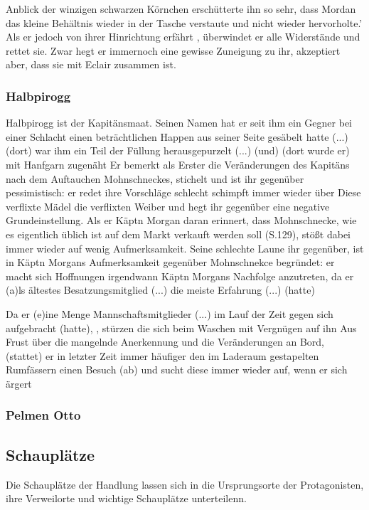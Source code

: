 {Anblick der winzigen schwarzen Körnchen erschütterte ihn so sehr, dass Mordan das kleine Behältnis wieder in der Tasche verstaute und nicht wieder hervorholte.'\cite[S.531]{pir} Als er jedoch von ihrer Hinrichtung erfährt , überwindet er alle Widerstände und rettet sie. \cite[S.620]{pir} Zwar hegt er immernoch eine gewisse Zuneigung zu ihr, akzeptiert aber, dass sie mit Eclair zusammen ist. \cite[S.632f]{pir}

\subsubsection{Halbpirogg}
Halbpirogg ist der Kapitänsmaat. Seinen Namen hat er seit ihm ein Gegner bei einer Schlacht 
einen beträchtlichen Happen aus seiner Seite gesäbelt hatte (...)(dort) 
war ihm ein Teil der Füllung herausgepurzelt (...) 
(und) (dort wurde er) mit Hanfgarn zugenäht\cite[S. 33]{pir}
Er bemerkt als Erster die Veränderungen des Kapitäns nach 
dem Auftauchen Mohnschneckes, stichelt und ist ihr gegenüber pessimistisch:
er redet ihre Vorschläge schlecht \cite[S. 266]{pir} schimpft immer wieder über Diese verflixte Mädel\cite[S. 145]{pir}
die verflixten Weiber \cite[302]{pir}und 
hegt ihr gegenüber eine negative Grundeinstellung. \cite[S. 297]{pir}
Als er Käptn Morgan daran erinnert, dass Mohnschnecke, wie es eigentlich üblich ist \cite[S.50]{pir} 
auf dem Markt verkauft werden soll (S.129), stößt dabei immer wieder auf wenig Aufmerksamkeit. \cite[S. 145]{pir}
Seine schlechte Laune ihr gegenüber, ist in Käptn Morgans Aufmerksamkeit gegenüber Mohnschnekce begründet: er macht
sich Hoffnungen irgendwann Käptn Morgans Nachfolge anzutreten, 
da er (a)ls ältestes Besatzungsmitglied (...) die meiste Erfahrung (...) (hatte)\cite[S.371]{pir}
 
Da er (e)ine Menge Mannschaftsmitglieder  (...) im Lauf der Zeit gegen sich aufgebracht (hatte), \cite[S.151]{pir}, 
stürzen die sich beim Waschen mit Vergnügen auf ihn \cite[S.151]{pir}
Aus Frust über die mangelnde Anerkennung und die Veränderungen an Bord, 
(stattet) er in letzter Zeit immer häufiger den im Laderaum gestapelten Rumfässern 
einen Besuch (ab) \cite[S. 181]{pir} und sucht diese immer wieder auf, wenn er sich ärgert \cite[S. 303]{pir}


\subsubsection{Pelmen Otto}


\subsection{Schauplätze}
Die Schauplätze der Handlung lassen sich in die Ursprungsorte der Protagonisten, ihre Verweilorte und wichtige Schauplätze unterteilenn.

}
